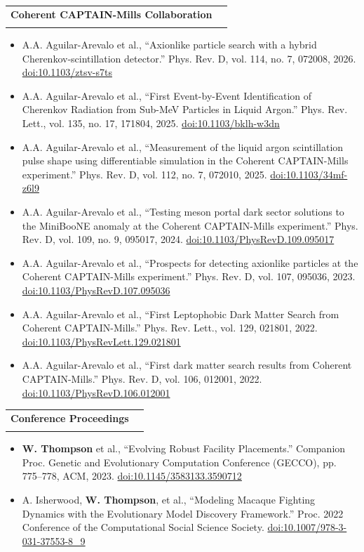 \documentclass[letterpaper,11pt]{article}
\makeatletter
\newcommand{\resumeItem}[1]{
  \item\small{
    {#1 \vspace{-2pt}}
  }
}
\newcommand{\resumeSubheading}[4]{
  \vspace{-2pt}\item
    \begin{tabular*}{0.97\textwidth}[t]{l@{\extracolsep{\fill}}r}
      \textbf{#1} & #2 \\
      \textit{\small#3} & \textit{\small #4} \\
    \end{tabular*}\vspace{-7pt}
}
\newcommand{\resumeItemListStart}{\begin{itemize}}
\newcommand{\resumeItemListEnd}{\end{itemize}\vspace{-5pt}}
\newcommand{\me}[1]{\textbf{#1}}
\makeatother
\begin{document}
  \resumeSubheading{Coherent CAPTAIN-Mills Collaboration}{}{}{}
    \resumeItemListStart
      \resumeItem{A.A. Aguilar-Arevalo et al., ``Axionlike particle search with a hybrid Cherenkov-scintillation detector.'' Phys. Rev. D, vol. 114, no. 7, 072008, 2026. \href{https://doi.org/10.1103/ztsv-s7ts}{doi:10.1103/ztsv-s7ts}}
      \resumeItem{A.A. Aguilar-Arevalo et al., ``First Event-by-Event Identification of Cherenkov Radiation from Sub-MeV Particles in Liquid Argon.'' Phys. Rev. Lett., vol. 135, no. 17, 171804, 2025. \href{https://doi.org/10.1103/bklh-w3dn}{doi:10.1103/bklh-w3dn}}
      \resumeItem{A.A. Aguilar-Arevalo et al., ``Measurement of the liquid argon scintillation pulse shape using differentiable simulation in the Coherent CAPTAIN-Mills experiment.'' Phys. Rev. D, vol. 112, no. 7, 072010, 2025. \href{https://doi.org/10.1103/34mf-z6l9}{doi:10.1103/34mf-z6l9}}
      \resumeItem{A.A. Aguilar-Arevalo et al., ``Testing meson portal dark sector solutions to the MiniBooNE anomaly at the Coherent CAPTAIN-Mills experiment.'' Phys. Rev. D, vol. 109, no. 9, 095017, 2024. \href{https://doi.org/10.1103/PhysRevD.109.095017}{doi:10.1103/PhysRevD.109.095017}}
      \resumeItem{A.A. Aguilar-Arevalo et al., ``Prospects for detecting axionlike particles at the Coherent CAPTAIN-Mills experiment.'' Phys. Rev. D, vol. 107, 095036, 2023. \href{https://doi.org/10.1103/PhysRevD.107.095036}{doi:10.1103/PhysRevD.107.095036}}
      \resumeItem{A.A. Aguilar-Arevalo et al., ``First Leptophobic Dark Matter Search from Coherent CAPTAIN-Mills.'' Phys. Rev. Lett., vol. 129, 021801, 2022. \href{https://doi.org/10.1103/PhysRevLett.129.021801}{doi:10.1103/PhysRevLett.129.021801}}
      \resumeItem{A.A. Aguilar-Arevalo et al., ``First dark matter search results from Coherent CAPTAIN-Mills.'' Phys. Rev. D, vol. 106, 012001, 2022. \href{https://doi.org/10.1103/PhysRevD.106.012001}{doi:10.1103/PhysRevD.106.012001}}
    \resumeItemListEnd

  \resumeSubheading{Conference Proceedings}{}{}{}
    \resumeItemListStart
      \resumeItem{\me{W. Thompson} et al., ``Evolving Robust Facility Placements.'' Companion Proc. Genetic and Evolutionary Computation Conference (GECCO), pp. 775--778, ACM, 2023. \href{https://doi.org/10.1145/3583133.3590712}{doi:10.1145/3583133.3590712}}
      \resumeItem{A. Isherwood, \me{W. Thompson}, et al., ``Modeling Macaque Fighting Dynamics with the Evolutionary Model Discovery Framework.'' Proc. 2022 Conference of the Computational Social Science Society. \href{https://doi.org/10.1007/978-3-031-37553-8_9}{doi:10.1007/978-3-031-37553-8\_9}}
    \resumeItemListEnd
\end{document}
